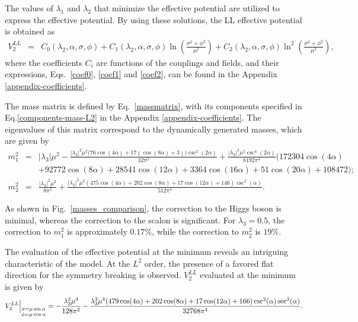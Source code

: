 \documentclass[11pt,a4paper,english,superscriptaddress,preprint,aps,prd]{revtex4}
\begin{document}
The values of $\lambda_1$ and $\lambda_2$ that minimize the effective potential are utilized to express the effective potential. By using these solutions, the LL effective potential is obtained as
\begin{eqnarray} \label{veffL2} 
V_2^{LL} &=& C_0(\lambda_2,\alpha,\sigma,\phi)+C_1(\lambda_2,\alpha,\sigma,\phi)\ln \left(\frac{\sigma ^2+\phi ^2}{\mu ^2}\right)+C_2(\lambda_2,\alpha,\sigma,\phi)\ln^2\left(\frac{\sigma ^2+\phi ^2}{\mu ^2}\right),
\end{eqnarray}
\noindent where the coefficients $C_i$ are functions of the couplings and fields, and their expressions, Eqs.~\eqref{coef0}, \eqref{coef1} and \eqref{coef2}, can be found in the Appendix \ref{appendix-coefficients}.

The mass matrix is defined by Eq.~\eqref{massmatrix}, with its components specified in Eq.\eqref{components-mass-L2} in the Appendix \ref{appendix-coefficients}. The eigenvalues of this matrix correspond to the dynamically generated masses, which are given by
\begin{subequations}
 \begin{eqnarray}
  m_{1}^2 &=& |\lambda_3| \mu ^2-\frac{|\lambda_3|^2 \mu ^2 \Big(76 \cos (4 \alpha )+17 (\cos (8 \alpha )+3)\Big) \csc ^2(2 \alpha )}{32 \pi ^2} + \frac{|\lambda_3|^3 \mu ^2\csc ^4(2\alpha )}{8192 \pi ^4} \Big(172304 \cos (4 \alpha )\nonumber\\
  &&+92772 \cos (8 \alpha )+28541 \cos (12 \alpha )+3364 \cos (16 \alpha )+51 \cos (20 \alpha )+108472\Big);\\
  m_{2}^2 &=& \frac{|\lambda_3|^2 \mu ^2}{8 \pi ^2}+\frac{|\lambda_3|^3 \mu ^2 (475 \cos (4 \alpha )+202 \cos (8 \alpha )+17 \cos (12 \alpha )+146) \csc ^2(\alpha )}{512 \pi ^4}.
 \end{eqnarray}
\end{subequations}

As shown in Fig.~\ref{masses_comparison}, the correction to the Higgs boson is minimal, whereas the correction to the scalon is significant. For $\lambda_3=0.5$, the correction to $m_1^2$ is approximately $0.17\%$, while the correction to $m_2^2$ is $19\%$.

The evaluation of the effective potential at the minimum reveals an intriguing characteristic of the model. At the $L^2$ order, the presence of a favored flat direction for the symmetry breaking is observed. $V^{LL}_2$ evaluated at the minimum is given by
 \begin{equation}\label{Vmin_2loop}
 V^{LL}_{2}\Big{|}_{\substack{\sigma=\mu\sin\alpha\\ \phi=\mu\cos\alpha}} = -\frac{\lambda_3^2 \mu ^4}{128 \pi ^2}-\frac{\lambda_3^3 \mu ^4 (479 \cos (4 \alpha )+202 \cos (8 \alpha )+17 \cos (12 \alpha )+166) \csc ^2(\alpha ) \sec ^2(\alpha )}{32768 \pi ^4}.
\end{equation}
\end{document}
